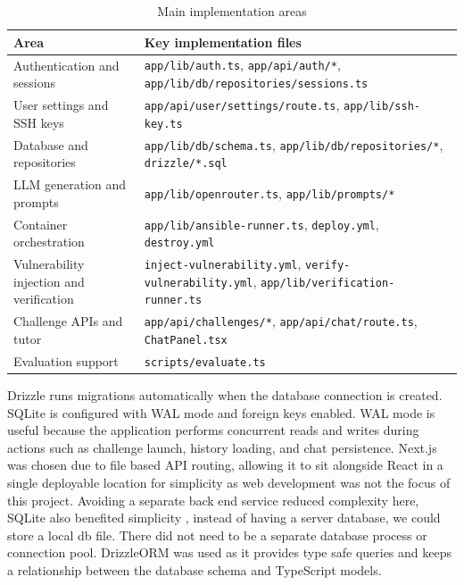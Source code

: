 \begin{table}[H]
	\centering
	\caption{Main implementation areas}
	\label{tab:implementation-areas}
	\begin{tabular}{|>{\raggedright\arraybackslash}p{4cm}|>{\raggedright\arraybackslash}p{9.5cm}|}
		\hline
		\textbf{Area}                            & \textbf{Key implementation files}                                                                                      \\
		\hline
		Authentication and sessions              & \lstinline|app/lib/auth.ts|, \lstinline|app/api/auth/*|, \lstinline{app/lib/db/repositories/sessions.ts}               \\
		\hline
		User settings and SSH keys               & \lstinline|app/api/user/settings/route.ts|, \lstinline|app/lib/ssh-key.ts|                                             \\
		\hline
		Database and repositories                & \lstinline|app/lib/db/schema.ts|, \lstinline|app/lib/db/repositories/*|, \lstinline|drizzle/*.sql|                     \\
		\hline
		LLM generation and prompts               & \lstinline|app/lib/openrouter.ts|, \lstinline{app/lib/prompts/*}                                                       \\
		\hline
		Container orchestration                  & \lstinline|app/lib/ansible-runner.ts|, \lstinline|deploy.yml|, \lstinline|destroy.yml|                                 \\
		\hline
		Vulnerability injection and verification & \lstinline|inject-vulnerability.yml|, \lstinline|verify-vulnerability.yml|, \lstinline|app/lib/verification-runner.ts| \\
		\hline
		Challenge APIs and tutor                 & \lstinline|app/api/challenges/*|, \lstinline|app/api/chat/route.ts|, \lstinline|ChatPanel.tsx|                         \\
		\hline
		Evaluation support                       & \lstinline|scripts/evaluate.ts|                                                                                        \\
		\hline
	\end{tabular}
\end{table}

Drizzle runs migrations automatically when the database connection is created. SQLite is configured with WAL mode and foreign keys enabled. WAL mode is useful because the application performs concurrent reads and writes during actions such as challenge launch, history loading, and chat persistence. Next.js was chosen due to file based API routing, allowing it to sit alongside React in a single deployable location for simplicity as web development was not the focus of this project. Avoiding a separate back end service reduced complexity here, SQLite also benefited simplicity , instead of having a server database, we could store a local db file. There did not need to be a separate database process or connection pool. DrizzleORM was used as it provides type safe queries and keeps a relationship between the database schema and TypeScript models.

